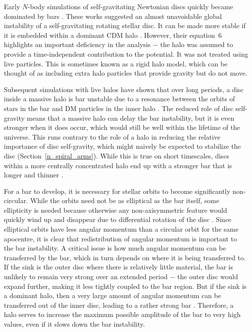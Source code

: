 \documentclass[fleqn,usenatbib,useAMS,onecolumn]{mnras} %
\begin{document}
Early $N$-body simulations of self-gravitating Newtonian discs quickly became dominated by bars \citep{Miller_1968, Hockney_1969, Hohl_1971}. These works suggested an almost unavoidable global instability of a self-gravitating rotating stellar disc. It can be made more stable if it is embedded within a dominant CDM halo \citep{Ostriker_Peebles_1973}. However, their equation~6 highlights an important deficiency in the analysis $-$ the halo was assumed to provide a time-independent contribution to the potential. It was not treated using live particles. This is sometimes known as a rigid halo model, which can be thought of as including extra halo particles that provide gravity but do not move.

Subsequent simulations with live halos have shown that over long periods, a disc inside a massive halo is bar unstable due to a resonance between the orbits of stars in the bar and DM particles in the inner halo \citep{Athanassoula_2002}. The reduced role of disc self-gravity means that a massive halo can delay the bar instability, but it is even stronger when it does occur, which would still be well within the lifetime of the universe. This runs contrary to the role of a halo in reducing the relative importance of disc self-gravity, which might naively be expected to stabilize the disc (Section~\ref{n_spiral_arms}). While this is true on short timescales, discs within a more centrally concentrated halo end up with a stronger bar that is longer and thinner \citep{Athanassoula_Misiriotis_2002}.

For a bar to develop, it is necessary for stellar orbits to become significantly non-circular. While the orbits need not be as elliptical as the bar itself, some ellipticity is needed because otherwise any non-axisymmetric feature would quickly wind up and disappear due to differential rotation of the disc \citep{Lin_1964}. Since elliptical orbits have less angular momentum than a circular orbit for the same apocentre, it is clear that redistribution of angular momentum is important to the bar instability. A critical issue is how much angular momentum can be transferred by the bar, which in turn depends on where it is being transferred to. If the sink is the outer disc where there is relatively little material, the bar is unlikely to remain very strong over an extended period $-$ the outer disc would expand further, making it less tightly coupled to the bar region. But if the sink is a dominant halo, then a very large amount of angular momentum can be transferred out of the inner disc, leading to a rather strong bar \citep{Athanassoula_2003}. Therefore, a halo serves to increase the maximum possible amplitude of the bar to very high values, even if it slows down the bar instability.
\end{document}
